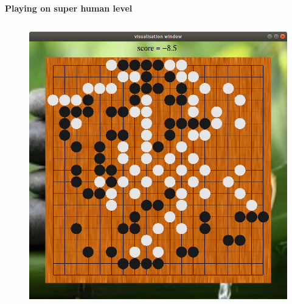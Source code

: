 \documentclass[xcolor=dvipsnames]{beamer}
\begin{document}
\begin{frame}{\bf Playing on super human level}
\begin{columns}
\begin{column}{0.5\textwidth}
    \centering


    \begin{figure}[!htb]
    \centering
    \includegraphics[scale=0.14]{../../diagrams/rl/go_board.png}
    \end{figure}


\end{column}
\end{columns}

\end{frame}
\end{document}
